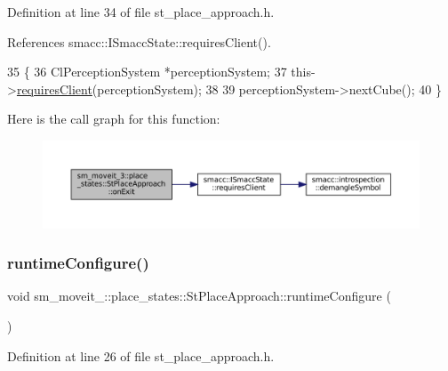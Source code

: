 Definition at line 34 of file st\+\_\+place\+\_\+approach.\+h.



References smacc\+::\+I\+Smacc\+State\+::requires\+Client().


\begin{DoxyCode}
35     \{
36         ClPerceptionSystem *perceptionSystem;
37         this->\hyperlink{classsmacc_1_1ISmaccState_a7f95c9f0a6ea2d6f18d1aec0519de4ac}{requiresClient}(perceptionSystem);
38 
39         perceptionSystem->nextCube();
40     \}
\end{DoxyCode}
Here is the call graph for this function\+:
\nopagebreak
\begin{figure}[H]
\begin{center}
\leavevmode
\includegraphics[width=350pt]{structsm__moveit__3_1_1place__states_1_1StPlaceApproach_aa0548cacb270a242ba202e50f3c9f576_cgraph}
\end{center}
\end{figure}
\mbox{\label{structsm__moveit__3_1_1place__states_1_1StPlaceApproach_aa0001a28f21038a8bc2f99f3a9c49b62}} 
\subsubsection{\texorpdfstring{runtime\+Configure()}{runtimeConfigure()}}
{\footnotesize\ttfamily void sm\+\_\+moveit\+\_\+::place\+\_\+states\+::\+St\+Place\+Approach\+::runtime\+Configure (\begin{DoxyParamCaption}{ }\end{DoxyParamCaption})\hspace{0.3cm}{\ttfamily [inline]}}



Definition at line 26 of file st\+\_\+place\+\_\+approach.\+h.



